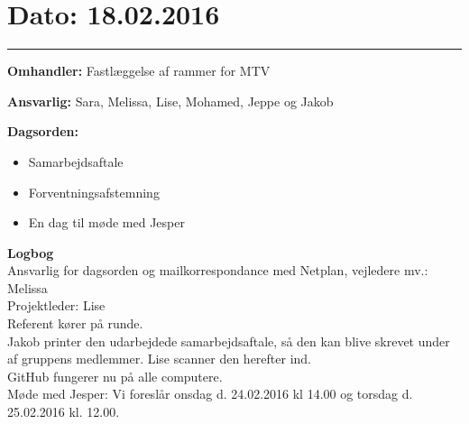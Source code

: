 \section{Dato: 18.02.2016}
\hrule

\textbf{Omhandler:} Fastlæggelse af rammer for MTV 

\textbf{Ansvarlig:} Sara, Melissa, Lise, Mohamed, Jeppe og Jakob

\textbf{Dagsorden:}
\begin{itemize}
	\item Samarbejdsaftale
	\item Forventningsafstemning
	\item En dag til møde med Jesper
\end{itemize}

\textbf{Logbog}
\\
Ansvarlig for dagsorden og mailkorrespondance med Netplan, vejledere mv.: Melissa\\
Projektleder: Lise\\
Referent kører på runde. \\
Jakob printer den udarbejdede samarbejdsaftale, så den kan blive skrevet under af gruppens medlemmer. Lise scanner den herefter ind.\\
GitHub fungerer nu på alle computere. \\
Møde med Jesper: Vi foreslår onsdag d. 24.02.2016 kl 14.00 og torsdag d. 25.02.2016 kl. 12.00.
\\
\\
